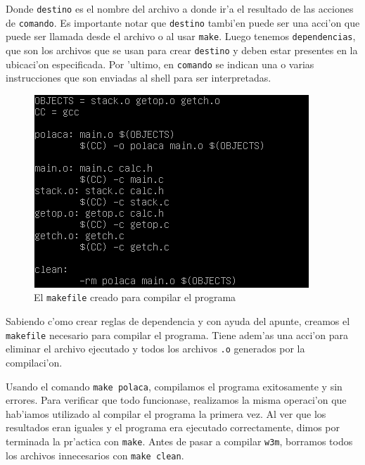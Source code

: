 \documentclass[11pt]{article}
\begin{document}
		Donde \texttt{\textcolor{light-blue}{destino}} es el nombre del archivo a donde ir'a el resultado de las acciones de \texttt{\textcolor{light-red}{comando}}. Es importante notar que \texttt{\textcolor{light-blue}{destino}} tambi'en puede ser una acci'on que puede ser llamada desde el archivo o al usar \texttt{make}. Luego tenemos \texttt{\textcolor{orange-desert-vim}{dependencias}}, que son los archivos que se usan para crear \texttt{\textcolor{light-blue}{destino}} y deben estar presentes en la ubicaci'on especificada. Por 'ultimo, en  \texttt{\textcolor{light-red}{comando}} se indican una o varias instrucciones que son enviadas al shell para ser interpretadas.
		
		\begin{figure}[H]
			\centering
			\includegraphics[width=.9\linewidth]{Images/Seccion 2/S2 parte tres.PNG}
			\caption{El \texttt{makefile} creado para compilar el programa}
			\label{fig:makefile}
		\end{figure}
		
		Sabiendo c'omo crear reglas de dependencia y con ayuda del apunte, creamos el \texttt{makefile} necesario para compilar el programa. Tiene adem'as una acci'on para eliminar el archivo ejecutado y todos los archivos \texttt{.o} generados por la compilaci'on.
		
		Usando el comando \texttt{make polaca}, compilamos el programa exitosamente y sin errores. Para verificar que todo funcionase, realizamos la misma operaci'on que hab'iamos utilizado al compilar el programa la primera vez. Al ver que los resultados eran iguales y el programa era ejecutado correctamente, dimos por terminada la pr'actica con \texttt{make}. Antes de pasar a compilar \texttt{w3m}, borramos todos los archivos innecesarios con \texttt{make clean}.
		
\end{document}
